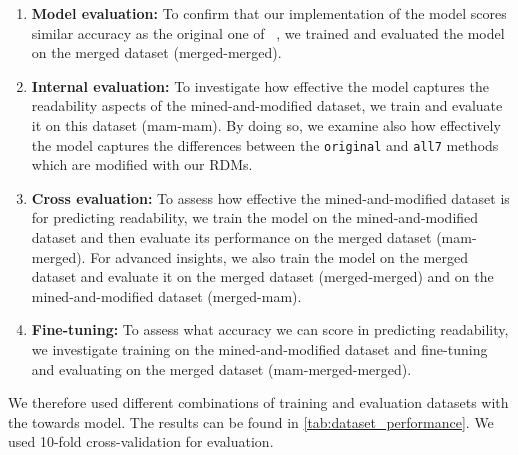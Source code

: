 \documentclass[%
class=scrreprt,
chapterprefix=false,%
open=right,%
twoside=false,%
paper=a4,%
logofile={Logo\_zentral\_farbig\_EN.png},%
thesistype=master,%
UKenglish,%
]{se2thesis}
\theoremstyle{definition}
\newcommand{\rdhs}{RDMs\xspace}
\begin{document}
	\begin{enumerate}
		\item \textbf{Model evaluation:}
		To confirm that our implementation of the model scores similar accuracy as the original one of \citeauthor{mi2022towards}~\cite{mi2022towards}, we trained and evaluated the model on the merged dataset (merged-merged).
		
		\item \textbf{Internal evaluation:} 
		To investigate how effective the model captures the readability aspects of the mined-and-modified dataset, we train and evaluate it on this dataset (mam-mam). By doing so, we examine also how effectively the model captures the differences between the \texttt{original} and \texttt{all7} methods which are modified with our \rdhs.
		
		\item \textbf{Cross evaluation:} 
		To assess how effective the mined-and-modified dataset is for predicting readability, we train the model on the mined-and-modified dataset and then evaluate its performance on the merged dataset (mam-merged). For advanced insights, we also train the model on the merged dataset and evaluate it on the merged dataset (merged-merged) and on the mined-and-modified dataset (merged-mam).
		
		\item \textbf{Fine-tuning:} 
		To assess what accuracy we can score in predicting readability, we investigate training on the mined-and-modified dataset and fine-tuning and evaluating on the merged dataset (mam-merged-merged).		
		
	\end{enumerate}
	
	We therefore used different combinations of training and evaluation datasets with the towards model. The results can be found in \autoref{tab:dataset_performance}. We used 10-fold cross-validation for evaluation.
		
\end{document}
